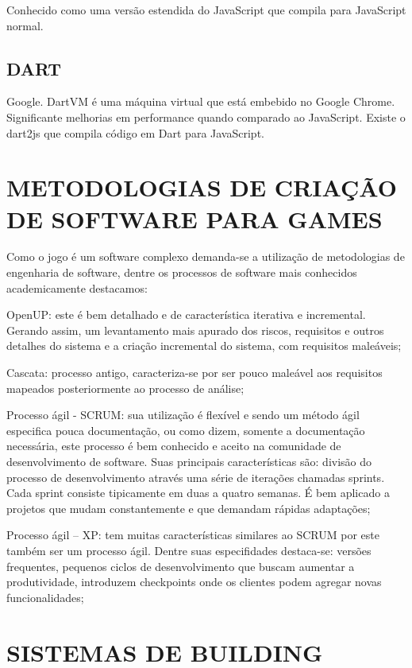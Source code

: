 Conhecido como uma versão estendida do JavaScript que compila para
JavaScript normal.

\section{DART}

Google. DartVM é uma máquina virtual que está embebido no Google
Chrome. Significante melhorias em performance quando comparado
ao JavaScript. Existe o dart2js que compila código em Dart para
JavaScript.

\chapter{METODOLOGIAS DE CRIAÇÃO DE SOFTWARE PARA GAMES}

Como o jogo é um software complexo demanda-se a utilização de
metodologias de engenharia de software, dentre os processos de software
mais conhecidos academicamente destacamos:

OpenUP: este é bem detalhado e de característica iterativa e
incremental. Gerando assim, um levantamento mais apurado dos riscos,
requisitos e outros detalhes do sistema e a criação incremental do
sistema, com requisitos maleáveis;

Cascata: processo antigo, caracteriza-se por ser pouco maleável aos
requisitos mapeados posteriormente ao processo de análise;

Processo ágil - SCRUM: sua utilização é flexível e sendo
um método ágil especifica pouca documentação, ou como dizem,
somente a documentação necessária, este processo é bem conhecido e
aceito na comunidade de desenvolvimento de software. Suas principais
características são: divisão do processo de desenvolvimento através
uma série de iterações chamadas sprints. Cada sprint consiste
tipicamente em duas a quatro semanas. É bem aplicado a projetos que
mudam constantemente e que demandam rápidas adaptações;

Processo ágil – XP: tem muitas características similares ao SCRUM
por este também ser um processo ágil. Dentre suas especifidades
destaca-se: versões frequentes, pequenos ciclos de desenvolvimento que
buscam aumentar a produtividade, introduzem checkpoints onde os clientes
podem agregar novas funcionalidades;

\chapter{SISTEMAS DE BUILDING}

